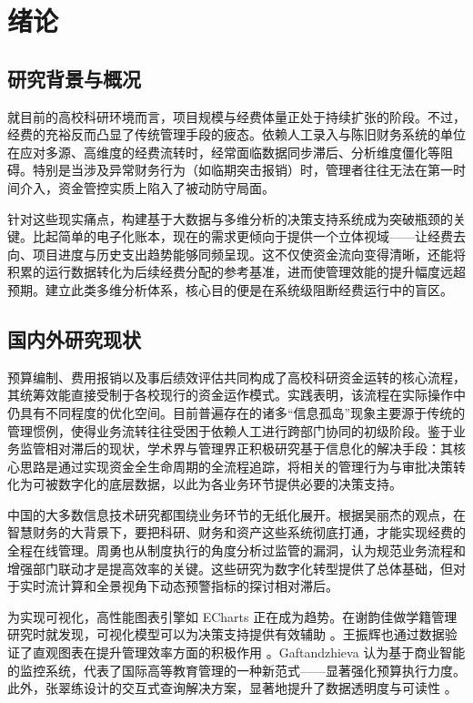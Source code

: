 \chapter{绪论}

\section{研究背景与概况}
就目前的高校科研环境而言，项目规模与经费体量正处于持续扩张的阶段。不过，经费的充裕反而凸显了传统管理手段的疲态。依赖人工录入与陈旧财务系统的单位在应对多源、高维度的经费流转时，经常面临数据同步滞后、分析维度僵化等阻碍。特别是当涉及异常财务行为（如临期突击报销）时，管理者往往无法在第一时间介入，资金管控实质上陷入了被动防守局面。

针对这些现实痛点，构建基于大数据与多维分析的决策支持系统成为突破瓶颈的关键。比起简单的电子化账本，现在的需求更倾向于提供一个立体视域——让经费去向、项目进度与历史支出趋势能够同频呈现。这不仅使资金流向变得清晰，还能将积累的运行数据转化为后续经费分配的参考基准，进而使管理效能的提升幅度远超预期。建立此类多维分析体系，核心目的便是在系统级阻断经费运行中的盲区。

\section{国内外研究现状}
预算编制、费用报销以及事后绩效评估共同构成了高校科研资金运转的核心流程，其统筹效能直接受制于各校现行的资金运作模式。实践表明，该流程在实际操作中仍具有不同程度的优化空间。目前普遍存在的诸多“信息孤岛”现象主要源于传统的管理惯例，使得业务流转往往受困于依赖人工进行跨部门协同的初级阶段。鉴于业务监管相对滞后的现状，学术界与管理界正积极研究基于信息化的解决手段：其核心思路是通过实现资金全生命周期的全流程追踪，将相关的管理行为与审批决策转化为可被数字化的底层数据，以此为各业务环节提供必要的决策支持。

中国的大多数信息技术研究都围绕业务环节的无纸化展开。根据吴丽杰的观点，在智慧财务的大背景下，要把科研、财务和资产这些系统彻底打通，才能实现经费的全程在线管理\cite{Wu2024}。周勇也从制度执行的角度分析过监管的漏洞，认为规范业务流程和增强部门联动才是提高效率的关键\cite{Zhou2010}。这些研究为数字化转型提供了总体基础，但对于实时流计算和全景视角下动态预警指标的探讨相对滞后。

为实现可视化，高性能图表引擎如 ECharts 正在成为趋势。在谢韵佳做学籍管理研究时就发现，可视化模型可以为决策支持提供有效辅助 \cite{Xie2019}。王振辉也通过数据验证了直观图表在提升管理效率方面的积极作用 \cite{Wang2021}。Gaftandzhieva 认为基于商业智能的监控系统，代表了国际高等教育管理的一种新范式——显著强化预算执行力度\cite{Gaftandzhieva2023}。此外，张翠练设计的交互式查询解决方案，显著地提升了数据透明度与可读性 \cite{Zhang2025}。

